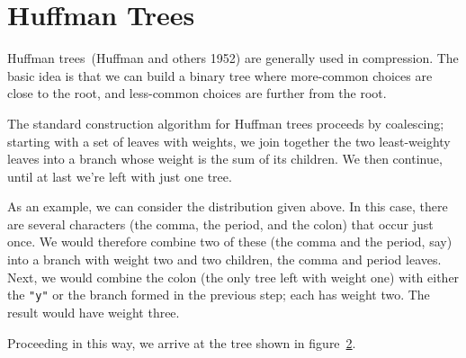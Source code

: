 \documentclass[preprint]{soups}
\newcommand{\sectionNewpage}{}
\newcommand{\Scribtexttt}[1]{{\texttt{#1}}}
\let\SOriginalthesubsection\thesubsection
\newcommand{\Ssection}[2]{\section[#1]{#2}\let\thesubsection\SOriginalthesubsection}
\newcommand{\FigureRef}[2]{\hyperref[#2]{#1}}
\begin{document}
\sectionNewpage

\Ssection{Huffman Trees}{Huffman Trees}\label{t:x28part_x22Huffmanx5fTreesx22x29}

Huffman trees~(Huffman and others 1952) are generally used in
compression. The basic idea is that we can build a binary
tree where more{-}common choices are close to the root, and
less{-}common choices are further from the root.

The standard construction algorithm for Huffman trees
proceeds by coalescing; starting with a set of leaves with
weights, we join together the two least{-}weighty leaves into
a branch whose weight is the sum of its children. We then
continue, until at last we{'}re left with just one tree.

As an example, we can consider the distribution given above.
In this case, there are several characters (the comma, the
period, and the colon) that occur just once.  We would
therefore combine two of these (the comma and the period,
say) into a branch with weight two and two children, the
comma and period leaves. Next, we would combine the colon
(the only tree left with weight one) with either the
\Scribtexttt{"y"} or the branch formed in the previous step; each has
weight two. The result would have weight three.

Proceeding in this way, we arrive at the tree shown in
figure~\FigureRef{2}{t:x28counter_x28x22figurex22_x22nextx2dletterx2dtreex22x29x29}.
\end{document}

